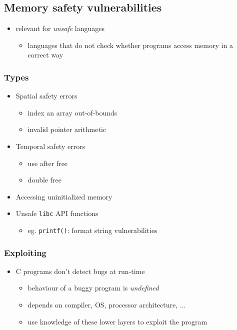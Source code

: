 \documentclass[12pt,titlepage,a4paper]{report}
\begin{document}
			
			\subsection{Memory safety vulnerabilities}
				\begin{itemize}
					\item relevant for \textit{unsafe} languages
					\begin{itemize}
						\item languages that do not check whether programs access memory in a correct way
					\end{itemize}
				\end{itemize}
			
				\subsubsection{Types}
					\begin{itemize}
						\item Spatial safety errors
						\begin{itemize}
							\item index an array out-of-bounds
							\item invalid pointer arithmetic
						\end{itemize}
						\item Temporal safety errors
						\begin{itemize}
							\item use after free
							\item double free
						\end{itemize}
						\item Accessing uninitialized memory
						\item Unsafe \texttt{libc} API functions
						\begin{itemize}
							\item eg. \texttt{printf()}: format string vulnerabilities
						\end{itemize}
					\end{itemize}

				\subsubsection{Exploiting}
					\begin{itemize}
						\item C programs don't detect bugs at run-time
						\begin{itemize}
							\item behaviour of a buggy program is \emph{undefined}
							\item depends on compiler, OS, processor architecture, ...
							\item use knowledge of these lower layers to exploit the program
						\end{itemize}
					\end{itemize}
\end{document}
